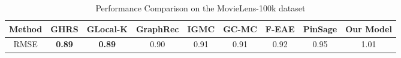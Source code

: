 \begin{table*}[htbp]
\centering
\begin{tabular}{||c|c|c|c|c|c|c|c|c||}
\hline
Method & \makecell{GHRS \\\cite{darban2022ghrs}} & \makecell{GLocal-K \\\cite{han2021glocal}} & \makecell{GraphRec \\\cite{rashed2019attribute}} & \makecell{IGMC \\\cite{zhanginductive}} & \makecell{GC-MC \\\cite{berg2017graph}} & \makecell{F-EAE \\\cite{hartford2018deep}} & \makecell{PinSage \\\cite{ying2018graph}} & Our Model \\
\hline\hline
RMSE & \textbf{0.89} & \textbf{0.89} & 0.90 & 0.91 & 0.91 & 0.92 & 0.95 & 1.01\\
\hline
\end{tabular}
\caption{Performance Comparison on the MovieLens-100k dataset}
\label{tab:MovieLens_compare}
\end{table*}